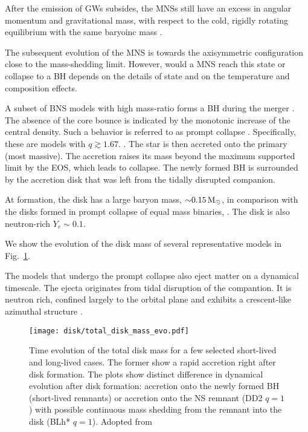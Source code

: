 After the emission of \acp{GW} subsides, the \acp{MNS} still have an excess in angular momentum and gravitational mass, with respect to the cold, rigidly rotating equilibrium with the same baryoinc mass \citep{Radice:2018xqa}.

The subsequent evolution of the \ac{MNS} is towards the axisymmetric configuration close to the mass-shedding limit. However, would a \ac{MNS} reach this state or collapse to a \ac{BH} depends on the details of \pmerg{} state and on the temperature and composition effects.


A subset of \ac{BNS} models with high mass-ratio forms a \ac{BH} 
during the merger \cite{Bernuzzi:2020txg}. The absence of the core bounce
is indicated by the monotonic increase of the central density.
Such a behavior is referred to as prompt collapse \citep{Radice:2020ddv,Bernuzzi:2020tgt,Bernuzzi:2020txg}.
Specifically, these are models with $q\gtrsim1.67$. 
. The star is then accreted onto the primary (most massive). 
The accretion raises its mass beyond the maximum supported limit by the \ac{EOS}, which leads to collapse. 
The newly formed \ac{BH} is surrounded by the accretion disk that was left from the tidally disrupted companion.

At formation, the disk has a large baryon mass, ${\sim}0.15\,{\text{M}_{\odot}}$, in comparison with the disks formed in prompt collapse of equal mass binaries, \citep[\eg][]{Radice:2018pdn}. 
The disk is also neutron-rich $Y_e\sim 0.1$.

We show the evolution of the disk mass of several representative models in Fig.~\ref{fig:disk_mass_evo}.

The models that undergo the prompt collapse also eject matter on a dynamical timescale. The ejecta originates from tidal disruption of the compantion. It is neutron rich, confined largely to the orbital plane and exhibits a crescent-like azimuthal structure \citep{Bernuzzi:2020txg}.

\begin{figure}[t]
    \centering 
    \texttt{[image: disk/total\_disk\_mass\_evo.pdf]}
    \caption{Time evolution of the total disk mass for a few selected
        short-lived and long-lived cases. The former show a rapid 
        accretion right after disk formation. The plots show
        distinct difference in dynamical evolution after disk formation: accretion onto
        the newly formed BH (short-lived remnants) or accretion onto the NS
        remnant (DD2 $q=1$) with possible continuous mass shedding from the remnant
        into the disk (BLh* $q=1$). Adopted from \citet{Nedora:2020pak}
    } 
    \label{fig:disk_mass_evo}
\end{figure}


